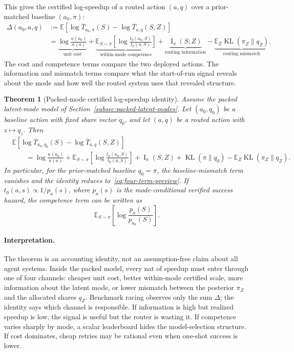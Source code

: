\documentclass{article}
\newtheorem{theorem}{Theorem}
\DeclareMathOperator{\KL}{KL}
\DeclareMathOperator{\MI}{I}
\newcommand{\E}{\mathbb{E}}
\begin{document}
This gives the certified log-speedup of a routed action \((a,q)\) over a prior-matched
baseline \((a_0,\pi)\):
\[
\boxed{
\begin{aligned}
    \Delta(a_0,a,q)
    &:=
    \E\!\left[
        \log \overline T_{a_0,\pi}(S)
        -
        \log \overline T_{a,q}(S,Z)
    \right]
    \\
    &=
    \underbrace{\log\frac{\kappa(a_0)}{\kappa(a)}}_{\text{unit cost}}
    +
    \underbrace{
    \E_{S\sim\pi}
    \left[
        \log\frac{t_0(a_0,S)}{t_0(a,S)}
    \right]
    }_{\text{within-mode competence}}
    +
    \underbrace{\MI_\pi(S;Z)}_{\text{routing information}}
    -
    \underbrace{
    \E_Z\KL(\pi_Z\|q_Z)
    }_{\text{routing mismatch}} .
\end{aligned}
}
\tag{2}
\label{eq:four-term-preview}
\]
The cost and competence terms compare the two deployed actions.
The information and mismatch terms compare what the start-of-run signal reveals about the
mode and how well the routed system uses that revealed structure.

\begin{theorem}[Packed-mode certified log-speedup identity]
\label{thm:packed-log-speedup}
Assume the packed latent-mode model of Section~\ref{subsec:packed-latent-modes}.
Let \((a_0,q_0)\) be a baseline action with fixed share vector \(q_0\), and let
\((a,q)\) be a routed action with \(z\mapsto q_z\).  Then
\[
\begin{aligned}
&\E\!\left[
    \log \overline T_{a_0,q_0}(S)
    -
    \log \overline T_{a,q}(S,Z)
\right]
\\
&\qquad =
\log\frac{\kappa(a_0)}{\kappa(a)}
+
\E_{S\sim\pi}
\left[
    \log\frac{t_0(a_0,S)}{t_0(a,S)}
\right]
+
\MI_\pi(S;Z)
+
\KL(\pi\|q_0)
-
\E_Z\KL(\pi_Z\|q_Z).
\end{aligned}
\]
In particular, for the prior-matched baseline \(q_0=\pi\), the baseline-mismatch term
vanishes and the identity reduces to~\eqref{eq:four-term-preview}.  If
\(t_0(a,s)\propto 1/p_a(s)\), where \(p_a(s)\) is the mode-conditional verified success
hazard, the competence term can be written as
\[
    \E_{S\sim\pi}
    \left[
        \log\frac{p_a(S)}{p_{a_0}(S)}
    \right].
\]
\end{theorem}

\paragraph{Interpretation.}
The theorem is an accounting identity, not an assumption-free claim about all agent
systems.  Inside the packed model, every nat of speedup must enter through one of four
channels: cheaper unit cost, better within-mode certified scale, more information about the
latent mode, or lower mismatch between the posterior \(\pi_Z\) and the allocated shares
\(q_Z\).  Benchmark racing observes only the sum \(\Delta\); the identity says which channel
is responsible.  If information is high but realized speedup is low, the signal is useful but
the router is wasting it.  If competence varies sharply by mode, a scalar leaderboard hides
the model-selection structure.  If cost dominates, cheap retries may be rational even when
one-shot success is lower.
\end{document}
